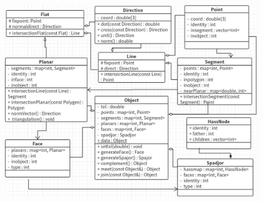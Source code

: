 \documentclass{beamer}
\newtheorem{thm}{Theorem}
\begin{document}
\begin{frame}
  \begin{figure}[htbp]
  	\includegraphics[scale=0.295]{UMLclass.png}
  \end{figure}
%
%    
%
%    
\end{frame}
\end{document}
